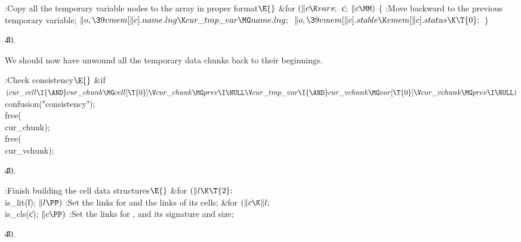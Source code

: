 \B{}:Copy all the temporary variable nodes to the  array
in proper format\X${}\E{}$\6
\&{for} ${}(\|c\K\\{vars};{}$ \|c; ${}\|c\MM){}$\5
${}\{{}$\1\6
:Move  backward to the previous temporary variable\X;%
\6
${}\|o,\39\\{vmem}[\|c].\\{name}.\\{lng}\K\\{cur\_tmp\_var}\MG\\{name}.%
\\{lng};{}$\6
${}\|o,\39\\{vmem}[\|c].\\{stable}\K\\{vmem}[\|c].\\{status}\K\T{0};{}$\6
\4${}\}{}$\2\par
\U40.\fi

We should now have unwound all the temporary data chunks back to their
beginnings.

\Y\B\4:Check consistency\X${}\E{}$\6
\&{if} ${}(\\{cur\_cell}\I{\AND}\\{cur\_chunk}\MG\\{cell}[\T{0}]\V\\{cur%
\_chunk}\MG\\{prev}\I\NULL\V\\{cur\_tmp\_var}\I{\AND}\\{cur\_vchunk}\MG\\{var}[%
\T{0}]\V\\{cur\_vchunk}\MG\\{prev}\I\NULL){}$\1\5
\\{confusion}(\.{"consistency"});\2\6
\\{free}(\\{cur\_chunk});\5
\\{free}(\\{cur\_vchunk});\par
\U40.\fi

\B{}:Finish building the cell data structures\X${}\E{}$\6
\&{for} ${}(\|l\K\T{2};{}$ \\{is\_lit}(\|l); ${}\|l\PP){}$\1\5
:Set the  links for  and the  links of its
cells\X;\2\6
\&{for} ${}(\|c\K\|l;{}$ \\{is\_cls}(\|c); ${}\|c\PP){}$\1\5
:Set the  links for , and its signature and size\X;\2%
\par
\U40.\fi

